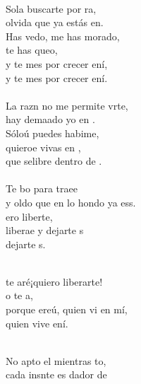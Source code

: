\begin{cancion}[En lo Hondo][Hakuna]%
	    \\
	Sola buscarte por ra,\\
	olvida que ya estás en. \\
	Has vedo, me has morado,\\
	te has queo,\\
	y te mes por crecer ení,\\
	y te mes por crecer ení.\\
\jump\\
	La razn no me permite vrte,\\
	hay demaado yo en .\\
	Sóloú puedes habime,\\
	quieroe vivas en , \\
	que selibre dentro de . \\
\jump\\
	Te bo para traee\\
	y oldo que en lo hondo ya ess.\\
	ero liberte,\\
	liberae y dejarte s \\
	dejarte s.\\\jump\\
	\begin{chorus}%
	te aré¡quiero liberarte! \\
	o te a, \\
	porque ereú, quien vi en mí,\\
	quien vive ení.\\
	\end{chorus}%
	\jump\\
	No apto el mientras to,\\
	cada insnte es dador de \\

\end{cancion}
